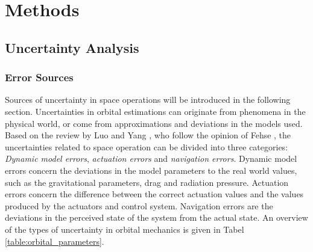 \section{Methods}


\subsection{Uncertainty Analysis}


\subsubsection{Error Sources}

Sources of uncertainty in space operations  will be introduced in the following section. Uncertainties in orbital estimations can originate from phenomena in the physical world, or come from approximations and deviations in the models used.  \\

Based on the review by Luo and Yang \cite{luo_review_2017}, who follow the opinion of Fehse \cite{2003ARaD}, the uncertainties related to space operation can be divided into three categories: \textit{Dynamic model errors}, \textit{actuation errors} and \textit{navigation errors}. Dynamic model errors concern the deviations in the model parameters to the real world values, such as the gravitational parameters, drag and radiation pressure. Actuation errors concern the difference between the correct actuation values and the values produced by the actuators and control system. Navigation errors are the deviations in the perceived state of the system from the actual state. An overview of the types of uncertainty in orbital mechanics is given in Tabel \ref{table:orbital_parameters}.\\



